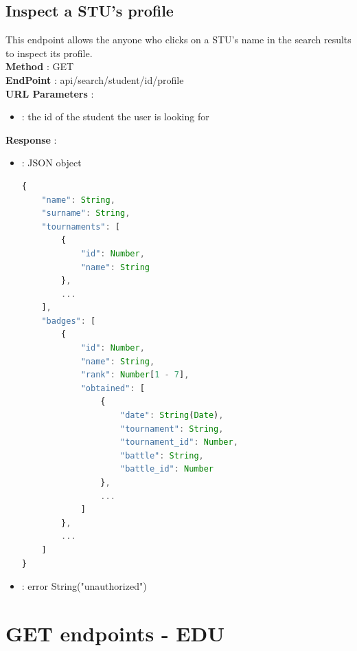 \subsection*{Inspect a STU's profile}
This endpoint allows the anyone who clicks on a STU's name in the search results to inspect its profile.\\ %
\textbf{Method} : GET \\
\textbf{EndPoint} : api/search/student/id/profile \\
\textbf{URL Parameters} :
    \begin{itemize}
        \item {} : the id of the student the user is looking for
    \end{itemize}
\textbf{Response} : 
    \begin{itemize}
        \item {} : JSON object
        \begin{lstlisting}[language=JavaScript, label={lst:jscode}, basicstyle=\ttfamily]
{
    "name": String,
    "surname": String,  
    "tournaments": [
        {
            "id": Number,
            "name": String
        },
        ...
    ],
    "badges": [
        {
            "id": Number,
            "name": String,
            "rank": Number[1 - 7],
            "obtained": [
                {
                    "date": String(Date),
                    "tournament": String,
                    "tournament_id": Number,
                    "battle": String,
                    "battle_id": Number
                },
                ...
            ]
        },
        ...
    ]
}
        \end{lstlisting}
        \item {} : error String("unauthorized")
    \end{itemize}



\section*{GET endpoints - EDU}

